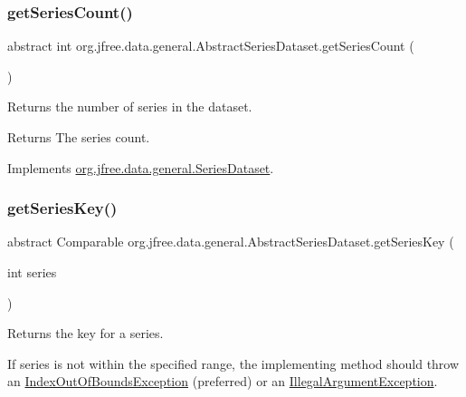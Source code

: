 \subsubsection{\texorpdfstring{get\+Series\+Count()}{getSeriesCount()}}
{\footnotesize\ttfamily abstract int org.\+jfree.\+data.\+general.\+Abstract\+Series\+Dataset.\+get\+Series\+Count (\begin{DoxyParamCaption}{ }\end{DoxyParamCaption})\hspace{0.3cm}{\ttfamily [abstract]}}

Returns the number of series in the dataset.

\begin{DoxyReturn}{Returns}
The series count. 
\end{DoxyReturn}


Implements \mbox{\hyperlink{interfaceorg_1_1jfree_1_1data_1_1general_1_1_series_dataset_a84fe822f5918f941d9de1ed1b73c9f58}{org.\+jfree.\+data.\+general.\+Series\+Dataset}}.

\mbox{\label{classorg_1_1jfree_1_1data_1_1general_1_1_abstract_series_dataset_afc45787d66065622852b5c4d6d4f422a}} 
\subsubsection{\texorpdfstring{get\+Series\+Key()}{getSeriesKey()}}
{\footnotesize\ttfamily abstract Comparable org.\+jfree.\+data.\+general.\+Abstract\+Series\+Dataset.\+get\+Series\+Key (\begin{DoxyParamCaption}\item[{int}]{series }\end{DoxyParamCaption})\hspace{0.3cm}{\ttfamily [abstract]}}

Returns the key for a series. 

If {\ttfamily series} is not within the specified range, the implementing method should throw an \mbox{\hyperlink{}{Index\+Out\+Of\+Bounds\+Exception}} (preferred) or an \mbox{\hyperlink{}{Illegal\+Argument\+Exception}}.


